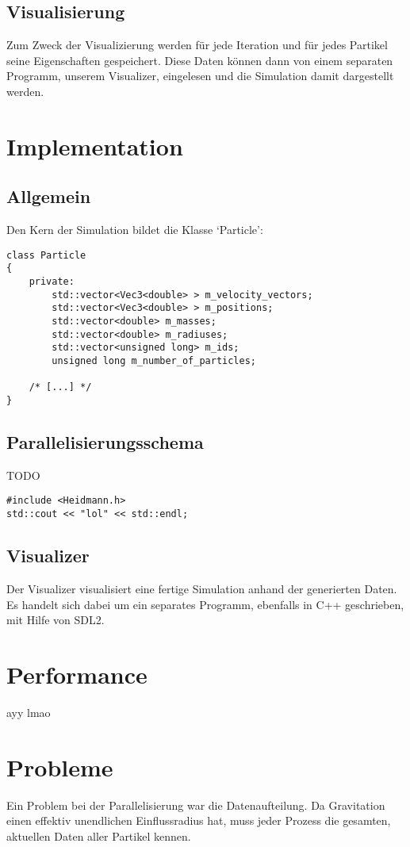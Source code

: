 \subsection{Visualisierung}
Zum Zweck der Visualizierung werden für jede Iteration und für jedes Partikel seine
Eigenschaften gespeichert. Diese Daten können dann von einem separaten Programm,
unserem Visualizer, eingelesen und die Simulation damit dargestellt werden.


\section{Implementation}
\subsection{Allgemein}
Den Kern der Simulation bildet die Klasse `Particle':
\begin{verbatim}
class Particle
{
    private:
        std::vector<Vec3<double> > m_velocity_vectors;
        std::vector<Vec3<double> > m_positions;
        std::vector<double> m_masses;
        std::vector<double> m_radiuses;
        std::vector<unsigned long> m_ids;
        unsigned long m_number_of_particles;

    /* [...] */
}
\end{verbatim}

\subsection{Parallelisierungsschema}
TODO

\begin{verbatim}
#include <Heidmann.h>
std::cout << "lol" << std::endl;
\end{verbatim}


\subsection{Visualizer}
Der Visualizer visualisiert eine fertige Simulation anhand der generierten Daten.
Es handelt sich dabei um ein separates Programm, ebenfalls in C++ geschrieben,
mit Hilfe von SDL2.

\section{Performance}
ayy lmao

\section{Probleme}
Ein Problem bei der Parallelisierung war die Datenaufteilung. Da Gravitation einen effektiv
unendlichen Einflussradius hat, muss jeder Prozess die gesamten, aktuellen Daten aller
Partikel kennen.

